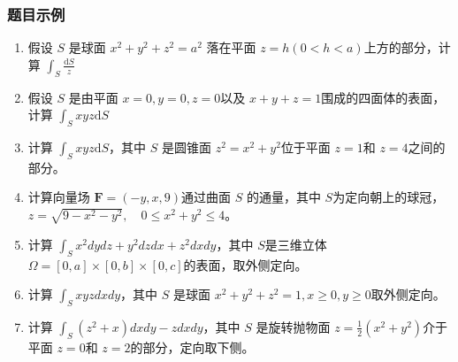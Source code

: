 \subsubsection{题目示例}
\begin{enumerate}
    \item 假设 $S$ 是球面 $x^2 + y^2 + z^2 =a^2$ 落在平面 $z = h(0 < h < a)$上方的部分，计算
    $\int _S \frac{\mathrm{d}S}{z}$

    \item 假设 $S$ 是由平面 $x=0, y=0, z=0$以及 $x+y+z=1$围成的四面体的表面，计算 $\int _S xyz \mathrm{d} S$

    \item 计算 $\int _S xyz \mathrm{d} S$，其中 $S$ 是圆锥面 $z^2 = x^2 + y^2$位于平面 $z=1$和 $z=4$之间的部分。

    \item 计算向量场 $\mathbf{F} = (-y, x, 9)$通过曲面 $S$ 的通量，其中 $S$为定向朝上的球冠，$z=\sqrt{9-x^2-y^2},\quad0\le x^2+y^2\le4$。

    \item 计算 $\int_Sx^2dydz+y^2dzdx+z^2dxdy$，其中 $S$是三维立体 $\Omega = [0,a] \times [0,b] \times [0,c]$的表面，取外侧定向。

    \item 计算 $\int _S xyz d x d y$，其中 $S$ 是球面 $x^2 + y^2 + z^2 = 1, x \ge 0, y \ge 0$取外侧定向。

    \item 计算 $\int _S (z^2 + x)dx dy - z dxdy$，其中 $S$ 是旋转抛物面 $z = \frac{1}{2}(x^2 + y^2)$介于平面 $z=0$和 $z=2$的部分，定向取下侧。
\end{enumerate}

